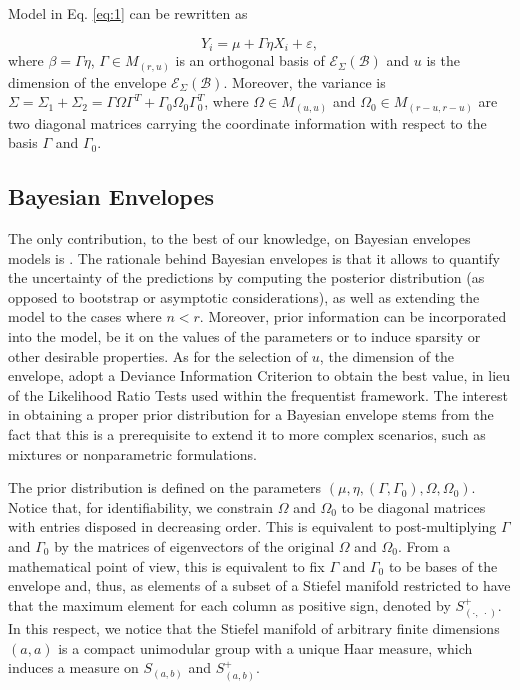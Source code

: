 \documentclass[graybox]{svmult}
\begin{document}
Model in Eq. \ref{eq:1} can be rewritten as

\begin{equation}
  \label{eq:3}
  Y_i = \mu + \Gamma \eta X_i + \varepsilon,
\end{equation}
where $\beta = \Gamma \eta$, $\Gamma \in M_{\left( r, u \right)}$ is
an orthogonal basis of
$\mathcal{E}_{\Sigma}\left( \mathcal{B} \right)$ and $u$ is the
dimension of the envelope
$\mathcal{E}_{\Sigma}\left( \mathcal{B} \right)$. Moreover, the
variance is
$\Sigma = \Sigma_1 + \Sigma_2 = \Gamma \Omega \Gamma^T + \Gamma_0
\Omega_0 \Gamma_0^T$, where $\Omega \in M_{\left( u, u \right)}$ and $\Omega_0 \in M_{\left( r-u, r-u \right)}$ are two diagonal matrices carrying the coordinate information with respect to the basis $\Gamma$ and $\Gamma_0$.

\subsection{Bayesian Envelopes}
The only contribution, to the best of our knowledge, on Bayesian
envelopes models is \cite{khareBayesianApproachEnvelope2017}. The
rationale behind Bayesian envelopes is that it allows to quantify the
uncertainty of the predictions by computing the posterior distribution
(as opposed to bootstrap or asymptotic considerations), as well as
extending the model to the cases where $n < r$. Moreover, prior
information can be incorporated into the model, be it on the values of
the parameters or to induce sparsity or other desirable properties. As
for the selection of $u$, the dimension of the envelope,
\cite{khareBayesianApproachEnvelope2017} adopt a Deviance Information
Criterion to obtain the best value, in lieu of the Likelihood Ratio
Tests used within the frequentist framework.  The interest in
obtaining a proper prior distribution for a Bayesian envelope stems
from the fact that this is a prerequisite to extend it to more complex
scenarios, such as mixtures or nonparametric formulations.

The prior distribution is defined on the parameters
$\left( \mu, \eta, \left(\Gamma, \Gamma_0\right), \Omega, \Omega_0
\right)$. Notice that, for identifiability, we constrain $\Omega$ and
$\Omega_0$ to be diagonal matrices with entries disposed in decreasing
order. This is equivalent to post-multiplying $\Gamma$ and $\Gamma_0$
by the matrices of eigenvectors of the original $\Omega$ and
$\Omega_0$. From a mathematical point of view, this is equivalent to fix $\Gamma$ and $\Gamma_0$ to be bases of the envelope and, thus, as elements of a subset of a Stiefel manifold restricted to have that the maximum element for each column as positive sign, denoted by $S^+_{\left( \cdot,\; \cdot \right)}$. In this respect, we notice that the Stiefel manifold of arbitrary finite dimensions $\left( a, a \right)$ is a compact unimodular group with a unique Haar measure, which induces a measure on $S_{\left( a, b\right)}$ and $S^+_{\left( a, b \right)}$.
\end{document}
